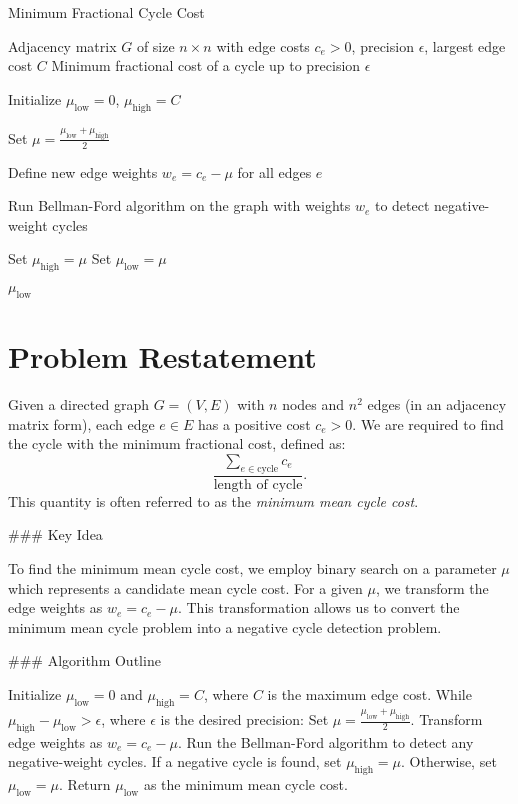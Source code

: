 \begin{algorithm}
    \caption{Minimum Fractional Cycle Cost}
    \begin{algorithmic}[1]
    \REQUIRE Adjacency matrix $G$ of size $n \times n$ with edge costs $c_e > 0$, precision $\epsilon$, largest edge cost $C$
    \ENSURE Minimum fractional cost of a cycle up to precision $\epsilon$
    
    \STATE Initialize $\mu_{\text{low}} = 0$, $\mu_{\text{high}} = C$
    
        \STATE Set $\mu = \frac{\mu_{\text{low}} + \mu_{\text{high}}}{2}$
        
        \STATE Define new edge weights $w_{e} = c_{e} - \mu$ for all edges $e$
        
        \STATE Run Bellman-Ford algorithm on the graph with weights $w_{e}$ to detect negative-weight cycles
        
            \STATE Set $\mu_{\text{high}} = \mu$ 
        \ELSE
            \STATE Set $\mu_{\text{low}} = \mu$ 
        \ENDIF
    \ENDWHILE
    
    \RETURN $\mu_{\text{low}}$
    \end{algorithmic}
    \end{algorithm}
\section*{Problem Restatement}

Given a directed graph \( G = (V, E) \) with \( n \) nodes and \( n^2 \) edges (in an adjacency matrix form), each edge \( e \in E \) has a positive cost \( c_e > 0 \). We are required to find the cycle with the minimum fractional cost, defined as:
\[
\frac{\sum_{e \in \text{cycle}} c_e}{\text{length of cycle}}.
\]
This quantity is often referred to as the \emph{minimum mean cycle cost}.

### Key Idea

To find the minimum mean cycle cost, we employ binary search on a parameter \( \mu \) which represents a candidate mean cycle cost. For a given \( \mu \), we transform the edge weights as \( w_e = c_e - \mu \). This transformation allows us to convert the minimum mean cycle problem into a negative cycle detection problem.

### Algorithm Outline

Initialize \( \mu_{\text{low}} = 0 \) and \( \mu_{\text{high}} = C \), where \( C \) is the maximum edge cost. While \( \mu_{\text{high}} - \mu_{\text{low}} > \epsilon \), where \( \epsilon \) is the desired precision: Set \( \mu = \frac{\mu_{\text{low}} + \mu_{\text{high}}}{2} \). Transform edge weights as \( w_e = c_e - \mu \). Run the Bellman-Ford algorithm to detect any negative-weight cycles. If a negative cycle is found, set \( \mu_{\text{high}} = \mu \). Otherwise, set \( \mu_{\text{low}} = \mu \).  Return \( \mu_{\text{low}} \) as the minimum mean cycle cost.

